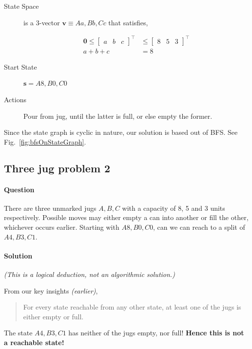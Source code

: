 \documentclass[11pt]{article}
\begin{document}
\begin{description}
\item[{State Space}] is a 3-vector \(\mathbf{v} \equiv
  Aa,Bb,Cc\) that satisfies,

\begin{align*}
\boldsymbol{0}
  \leqslant \begin{bmatrix}a&b&c \end{bmatrix}^{\top}
  & \leqslant \begin{bmatrix}8&5&3 \end{bmatrix}^{\top}
  \\
  a+b+c &= 8
\end{align*}

\item[{Start State}] \(\mathbf{s}=A8,B0,C0\)

\item[{Actions}] Pour from jug, until the latter is full,
or else empty the former.
\end{description}

Since the state graph is cyclic in nature, our solution
is based out of BFS. See 
Fig.~\ref{fig:bfsOnStateGraph}.

\subsection{Three jug problem 2}
\label{sec:org3b2338e}
\paragraph*{Question}
\label{sec:org4b419c4}
There are three unmarked jugs \(A,B,C\) with a capacity
of 8, 5 and 3 units respectively.  Possible moves may
either empty a can into another or fill the other,
whichever occurs earlier.  Starting with \(A8,B0,C0\),
can we can reach to a split of \(A4,B3,C1\).

\paragraph*{Solution}
\label{sec:org566cf5a}

\emph{(This is a logical deduction, not an algorithmic
solution.)}

From our key insights \emph{(earlier)},

\begin{quote}
For every state reachable from any other state, at
least one of the jugs is either empty or full.
\end{quote}

The state \(A4,B3,C1\) has neither of the jugs empty, nor
full!  \textbf{Hence this is not a reachable state!}
\end{document}
